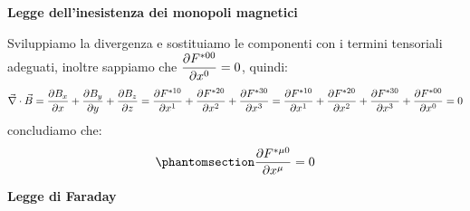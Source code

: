 \textbf{Legge dell'inesistenza dei monopoli magnetici}

Sviluppiamo la divergenza e sostituiamo le componenti con i termini tensoriali adeguati, inoltre sappiamo che $\dfrac{\partial F\indices{^{*00}}}{\partial x^0}=0$, quindi:
\begin{equation*}
    \Vec{\nabla}\cdot\Vec{B}=\dfrac{\partial B_x}{\partial x}+\dfrac{\partial B_y}{\partial y}+\dfrac{\partial B_z}{\partial z}=\dfrac{\partial F\indices{^{*10}}}{\partial x^1}+\dfrac{\partial F\indices{^{*20}}}{\partial x^2}+\dfrac{\partial F\indices{^{*30}}}{\partial x^3}=\dfrac{\partial F\indices{^{*10}}}{\partial x^1}+\dfrac{\partial F\indices{^{*20}}}{\partial x^2}+\dfrac{\partial F\indices{^{*30}}}{\partial x^3}+\dfrac{\partial F\indices{^{*00}}}{\partial x^0}=0
\end{equation*} 
concludiamo che:
\begin{equation}\phantomsection\label{eq:leg_mono}
    \dfrac{\partial F\indices{^{*\mu0}}}{\partial x^\mu}=0
\end{equation}


\textbf{Legge di Faraday}

